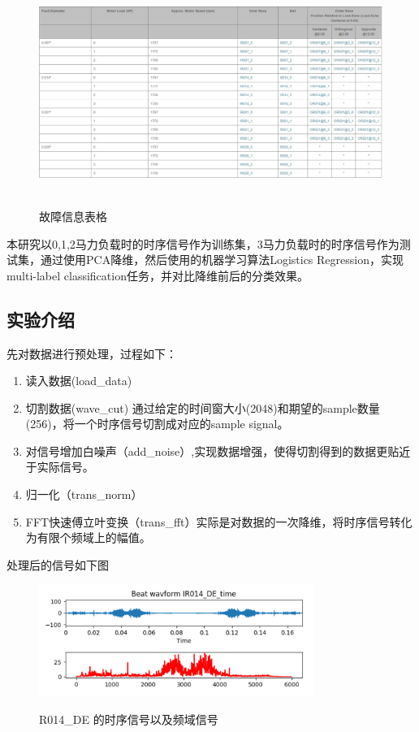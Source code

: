 \documentclass[UTF8]{ctexart}
\begin{document}
	\begin{figure}[H]
	  \centering
	  \label{fig:Per3A}\includegraphics[width=1.0\textwidth]{summary.png}\
	  \caption{故障信息表格}
	  \label{fig:oscil}    
	\end{figure}


\vspace{3mm}  

本研究以0,1,2马力负载时的时序信号作为训练集，3马力负载时的时序信号作为测试集，通过使用PCA降维，然后使用的机器学习算法Logistics Regression，实现multi-label classification任务，并对比降维前后的分类效果。

\subsection{实验介绍}
先对数据进行预处理，过程如下：
\begin{enumerate}
	\item 读入数据(load\_data)
	\item 切割数据(wave\_cut) 通过给定的时间窗大小(2048)和期望的sample数量(256)，将一个时序信号切割成对应的sample signal。
	\item 对信号增加白噪声（add\_noise）,实现数据增强，使得切割得到的数据更贴近于实际信号。
	\item 归一化（trans\_norm）
	\item FFT快速傅立叶变换（trans\_fft）实际是对数据的一次降维，将时序信号转化为有限个频域上的幅值。
\end{enumerate}
处理后的信号如下图
	\begin{figure}[H]
	  \centering
	  \label{fig:Per3A}\includegraphics[width=0.8\textwidth]{timesig.png}\
	  \caption{R014\_DE 的时序信号以及频域信号}
	  \label{fig:oscil}    
	\end{figure}
	
\end{document}
